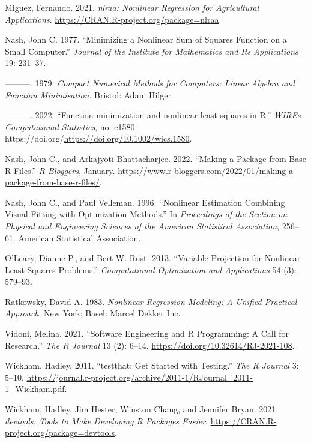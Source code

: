 \documentclass[
]{article}
\newlength{\cslhangindent}
\newlength{\cslentryspacingunit} %
\newenvironment{CSLReferences}[2] %
 {%
  \setlength{\parindent}{0pt}
  \ifodd #1
  \let\oldpar\par
  \def\par{\hangindent=\cslhangindent\oldpar}
  \fi
  \setlength{\parskip}{#2\cslentryspacingunit}
 }%
 {}
\begin{document}
\begin{CSLReferences}{1}{0}
\leavevmode{}%
Miguez, Fernando. 2021. \emph{{nlraa: Nonlinear Regression for
Agricultural Applications}}.
\url{https://CRAN.R-project.org/package=nlraa}.

\leavevmode{}%
Nash, John C. 1977. {``Minimizing a Nonlinear Sum of Squares Function on
a Small Computer.''} \emph{Journal of the Institute for Mathematics and
Its Applications} 19: 231--37.

\leavevmode{}%
---------. 1979. \emph{Compact Numerical Methods for Computers: Linear
Algebra and Function Minimisation}. Bristol: Adam Hilger.

\leavevmode{}%
---------. 2022. {``{Function minimization and nonlinear least squares
in R}.''} \emph{WIREs Computational Statistics}, no. e1580.
https://doi.org/\url{https://doi.org/10.1002/wics.1580}.

\leavevmode{}%
Nash, John C., and Arkajyoti Bhattacharjee. 2022. {``Making a Package
from Base {R} Files.''} \emph{R-Bloggers}, January.
\url{https://www.r-bloggers.com/2022/01/making-a-package-from-base-r-files/}.

\leavevmode{}%
Nash, John C., and Paul Velleman. 1996. {``Nonlinear Estimation
Combining Visual Fitting with Optimization Methods.''} In
\emph{Proceedings of the Section on Physical and Engineering Sciences of
the American Statistical Association}, 256--61. American Statistical
Association.

\leavevmode{}%
O'Leary, Dianne P., and Bert W. Rust. 2013. {``Variable Projection for
Nonlinear Least Squares Problems.''} \emph{Computational Optimization
and Applications} 54 (3): 579--93.

\leavevmode{}%
Ratkowsky, David A. 1983. \emph{Nonlinear Regression Modeling: A Unified
Practical Approach}. New York; Basel: Marcel Dekker Inc.

\leavevmode{}%
Vidoni, Melina. 2021. {``{Software Engineering and R Programming: A Call
for Research}.''} \emph{{The R Journal}} 13 (2): 6--14.
\url{https://doi.org/10.32614/RJ-2021-108}.

\leavevmode{}%
Wickham, Hadley. 2011. {``{testthat: Get Started with Testing}.''}
\emph{The R Journal} 3: 5--10.
\url{https://journal.r-project.org/archive/2011-1/RJournal_2011-1_Wickham.pdf}.

\leavevmode{}%
Wickham, Hadley, Jim Hester, Winston Chang, and Jennifer Bryan. 2021.
\emph{{devtools: Tools to Make Developing R Packages Easier}}.
\url{https://CRAN.R-project.org/package=devtools}.

\end{CSLReferences}
\end{document}
